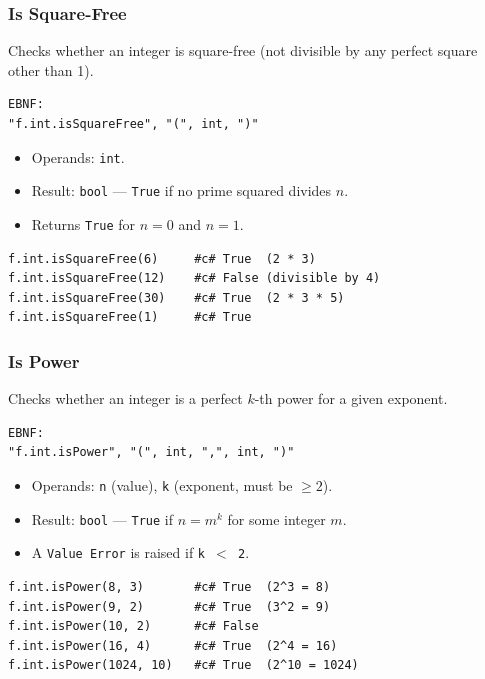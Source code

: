 \subsubsection{Is Square-Free}
Checks whether an integer is square-free (not divisible by any perfect square other than 1).
\begin{verbatim}
EBNF:
"f.int.isSquareFree", "(", int, ")"
\end{verbatim}
\begin{itemize}
\item Operands: \texttt{int}.
\item Result: \texttt{bool} --- \texttt{True} if no prime squared divides $n$.
\item Returns \texttt{True} for $n = 0$ and $n = 1$.
\end{itemize}
\begin{verbatim}
f.int.isSquareFree(6)     #c# True  (2 * 3)
f.int.isSquareFree(12)    #c# False (divisible by 4)
f.int.isSquareFree(30)    #c# True  (2 * 3 * 5)
f.int.isSquareFree(1)     #c# True
\end{verbatim}

\subsubsection{Is Power}
Checks whether an integer is a perfect $k$-th power for a given exponent.
\begin{verbatim}
EBNF:
"f.int.isPower", "(", int, ",", int, ")"
\end{verbatim}
\begin{itemize}
\item Operands: \texttt{n} (value), \texttt{k} (exponent, must be $\geq 2$).
\item Result: \texttt{bool} --- \texttt{True} if $n = m^k$ for some integer $m$.
\item A \texttt{Value Error} is raised if \texttt{k $<$ 2}.
\end{itemize}
\begin{verbatim}
f.int.isPower(8, 3)       #c# True  (2^3 = 8)
f.int.isPower(9, 2)       #c# True  (3^2 = 9)
f.int.isPower(10, 2)      #c# False
f.int.isPower(16, 4)      #c# True  (2^4 = 16)
f.int.isPower(1024, 10)   #c# True  (2^10 = 1024)
\end{verbatim}

